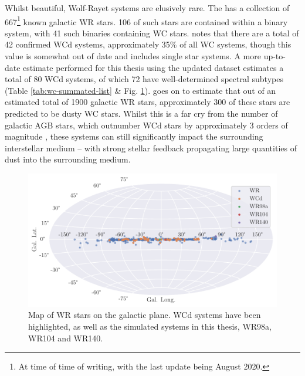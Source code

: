 Whilst beautiful, Wolf-Rayet systems are elusively rare.
The  \parencite{rossloweSpatialDistributionGalactic2015} has a collection of 667\footnote{At time of time of writing, with the last update being August 2020.} known galactic WR stars.
106 of such stars are contained within a binary system, with 41 such binaries containing WC stars.
\textcite{rossloweSpatialDistributionGalactic2015} notes that there are a total of 42 confirmed WCd systems, approximately 35\% of all WC systems, though this value is somewhat out of date and includes single star systems.
A more up-to-date estimate performed for this thesis using the updated dataset estimates a total of 80 WCd systems, of which 72 have well-determined spectral subtypes (Table \ref{tab:wc-summated-list} \& Fig. \ref{fig:wrmap}).
\textcite{rossloweSpatialDistributionGalactic2015} goes on to estimate that out of an estimated total of \num{1900} galactic WR stars, approximately \num{300} of these stars are predicted to be dusty WC stars.
Whilst this is a far cry from the number of galactic AGB stars, which outnumber WCd stars by approximately 3 orders of magnitude \parencite{ishiharaGalacticDistributionsCarbon2011}, these systems can still significantly impact the surrounding interstellar medium -- with strong stellar feedback propagating large quantities of dust into the surrounding medium.

\begin{figure}[h]
  \centering
  \includegraphics[width=\linewidth]{assets/galactic.pdf}
  \caption[Map of WR stars on the galactic plane]{Map of WR stars on the galactic plane. WCd systems have been highlighted, as well as the simulated systems in this thesis, WR98a, WR104 and WR140.}
  \label{fig:wrmap}
\end{figure}

